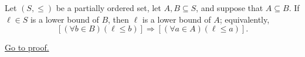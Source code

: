 \begin{lemma}
\label{lem:subset-inclusion-preserves-lower-bounds}
Let $(S,\leq)$ be a partially ordered set, let $A,B\subseteq S$, and suppose
that $A\subseteq B$. If $\ell\in S$ is a lower bound of $B$, then $\ell$ is
a lower bound of $A$; equivalently,
\[
  \left[(\forall b\in B)(\ell\leq b)\right]
  \Longrightarrow
  \left[(\forall a\in A)(\ell\leq a)\right].
\]

\hyperref[prf:subset-inclusion-preserves-lower-bounds]{Go to proof.}
\end{lemma}